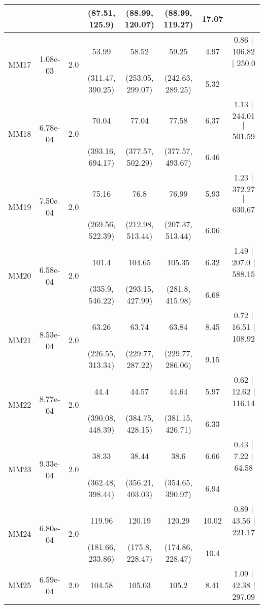 \begin{longtable}{|c|c|c|c|c|c|c|c|}
	 &  &  & (87.51, 125.9) & (88.99, 120.07) & (88.99, 119.27) & 17.07 & \\
 	\hline
	\multirow{2}{*}{MM17} & \multirow{2}{*}{1.08e-03} & \multirow{2}{*}{2.0} & 53.99 & 58.52 & 59.25 & 4.97 & 0.86 $\mid$ 106.82 $\mid$ 250.0\\
	 &  &  & (311.47, 390.25) & (253.05, 299.07) & (242.63, 289.25) & 5.32 & \\
 	\hline
	\multirow{2}{*}{MM18} & \multirow{2}{*}{6.78e-04} & \multirow{2}{*}{2.0} & 70.04 & 77.04 & 77.58 & 6.37 & 1.13 $\mid$ 244.01 $\mid$ 501.59\\
	 &  &  & (393.16, 694.17) & (377.57, 502.29) & (377.57, 493.67) & 6.46 & \\
 	\hline
	\multirow{2}{*}{MM19} & \multirow{2}{*}{7.50e-04} & \multirow{2}{*}{2.0} & 75.16 & 76.8 & 76.99 & 5.93 & 1.23 $\mid$ 372.27 $\mid$ 630.67\\
	 &  &  & (269.56, 522.39) & (212.98, 513.44) & (207.37, 513.44) & 6.06 & \\
 	\hline
	\multirow{2}{*}{MM20} & \multirow{2}{*}{6.58e-04} & \multirow{2}{*}{2.0} & 101.4 & 104.65 & 105.35 & 6.32 & 1.49 $\mid$ 207.0 $\mid$ 588.15\\
	 &  &  & (335.9, 546.22) & (293.15, 427.99) & (281.8, 415.98) & 6.68 & \\
 	\hline
	\multirow{2}{*}{MM21} & \multirow{2}{*}{8.53e-04} & \multirow{2}{*}{2.0} & 63.26 & 63.74 & 63.84 & 8.45 & 0.72 $\mid$ 16.51 $\mid$ 108.92\\
	 &  &  & (226.55, 313.34) & (229.77, 287.22) & (229.77, 286.06) & 9.15 & \\
 	\hline
	\multirow{2}{*}{MM22} & \multirow{2}{*}{8.77e-04} & \multirow{2}{*}{2.0} & 44.4 & 44.57 & 44.64 & 5.97 & 0.62 $\mid$ 12.62 $\mid$ 116.14\\
	 &  &  & (390.08, 448.39) & (384.75, 428.15) & (381.15, 426.71) & 6.33 & \\
 	\hline
	\multirow{2}{*}{MM23} & \multirow{2}{*}{9.33e-04} & \multirow{2}{*}{2.0} & 38.33 & 38.44 & 38.6 & 6.66 & 0.43 $\mid$ 7.22 $\mid$ 64.58\\
	 &  &  & (362.48, 398.44) & (356.21, 403.03) & (354.65, 390.97) & 6.94 & \\
 	\hline
	\multirow{2}{*}{MM24} & \multirow{2}{*}{6.80e-04} & \multirow{2}{*}{2.0} & 119.96 & 120.19 & 120.29 & 10.02 & 0.89 $\mid$ 43.56 $\mid$ 221.17\\
	 &  &  & (181.66, 233.86) & (175.8, 228.47) & (174.86, 228.47) & 10.4 & \\
 	\hline
	\multirow{2}{*}{MM25} & \multirow{2}{*}{6.59e-04} & \multirow{2}{*}{2.0} & 104.58 & 105.03 & 105.2 & 8.41 & 1.09 $\mid$ 42.38 $\mid$ 297.09\\

\end{longtable}
